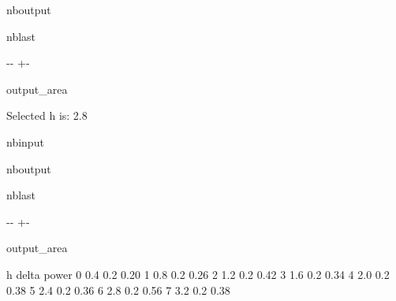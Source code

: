 \documentclass[letterpaper,10pt,english,openany,oneside]{sphinxmanual}
\begin{document}
\begin{sphinxuseclass}{nboutput}
\begin{sphinxuseclass}{nblast}
{

\kern-\sphinxverbatimsmallskipamount\kern-\baselineskip
\kern+\FrameHeightAdjust\kern-\fboxrule
\vspace{\nbsphinxcodecellspacing}

\begin{sphinxuseclass}{output_area}
\begin{sphinxuseclass}{}


\begin{sphinxVerbatim}[commandchars=\\\{\}]
Selected h is:  2.8
\end{sphinxVerbatim}



\end{sphinxuseclass}
\end{sphinxuseclass}
}

\end{sphinxuseclass}
\end{sphinxuseclass}
\begin{sphinxuseclass}{nbinput}
{
\begin{sphinxVerbatim}[commandchars=\\\{\}]
\llap{\color{nbsphinxin}[17]:\,\hspace{\fboxrule}\hspace{\fboxsep}}
\end{sphinxVerbatim}
}

\end{sphinxuseclass}
\begin{sphinxuseclass}{nboutput}
\begin{sphinxuseclass}{nblast}
{

\kern-\sphinxverbatimsmallskipamount\kern-\baselineskip
\kern+\FrameHeightAdjust\kern-\fboxrule
\vspace{\nbsphinxcodecellspacing}

\begin{sphinxuseclass}{output_area}
\begin{sphinxuseclass}{}


\begin{sphinxVerbatim}[commandchars=\\\{\}]
\llap{\color{nbsphinxout}[17]:\,\hspace{\fboxrule}\hspace{\fboxsep}}     h  delta  power
0  0.4    0.2   0.20
1  0.8    0.2   0.26
2  1.2    0.2   0.42
3  1.6    0.2   0.34
4  2.0    0.2   0.38
5  2.4    0.2   0.36
6  2.8    0.2   0.56
7  3.2    0.2   0.38
\end{sphinxVerbatim}



\end{sphinxuseclass}
\end{sphinxuseclass}
}

\end{sphinxuseclass}
\end{sphinxuseclass}
\end{document}
